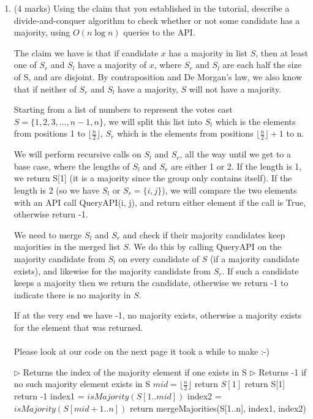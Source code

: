 \documentclass[11pt]{article}
\begin{document}
\begin{enumerate}
\item \label{Hooli-give-algorithm}
(4 marks)
  Using the claim that you established in the tutorial, describe a divide-and-conquer algorithm to check whether or not some candidate has a majority, using $O(n\log n)$ queries to the API. 

\begin{soln}
The claim we have is that if candidate $x$ has a majority in list $S$, then at least one of $S_r$ and $S_l$ have a majority of $x$, where $S_r $ and $ S_l$ are each half the size of S, and are disjoint. By contraposition and De Morgan's law, we also know that if neither of $S_r $ and $ S_l$ have a majority, $S$ will not have a majority.

Starting from a list of numbers to represent the votes cast $S = \{1,2,3,...,n-1,n\}$, we will split this list into $S_l$ which is the elements from positions 1 to $\lfloor \frac{n}{2} \rfloor$, $S_r$ which is the elements from positions $\lfloor \frac{n}{2} \rfloor + 1$ to n. 

We will perform recursive calls on $S_l$ and $S_r$, all the way until we get to a base case, where the lengths of $S_l$ and $S_r$ are either 1 or 2. If the length is 1, we return S[1] (it is a majority since the group only contains itself). If the length is 2 (so we have $S_{l} $ or $ S_r = \{ i, j \}$), we will compare the two elements with an API call QueryAPI(i, j), and return either element if the call is True, otherwise return -1.

We need to merge $S_l$ and $S_r$ and check if their majority candidates keep majorities in the merged list $S$. We do this by calling QueryAPI on the majority candidate from $S_l$ on every candidate of $S$ (if a majority candidate exists), and likewise for the majority candidate from $S_r$. If such a candidate keeps a majority then we return the candidate, otherwise we return -1 to indicate there is no majority in $S$.

If at the very end we have -1, no majority exists, otherwise a majority exists for the element that was returned.
\\
\\
Please look at our code on the next page it took a while to make :-)
\newpage

\begin{algorithmic}[1]
\State $\triangleright$ Returns the index of the majority element if one exists in S
\State $\triangleright$ Returns -1 if no such majority element exists in S
\State $mid = \lfloor\frac{n}{2}\rfloor$
 
\State return $S[1] $
 
    \State return S[1] 
    \Else
        \State return -1 
    \EndIf
\Else
\State index1 = $isMajority(S[1..mid ])$ 
\State index2 = $isMajority(S[mid  + 1 ..n])$
\State return mergeMajorities(S[1..n], index1, index2) 


\end{algorithmic}
\end{soln}
\end{enumerate}
\end{document}
